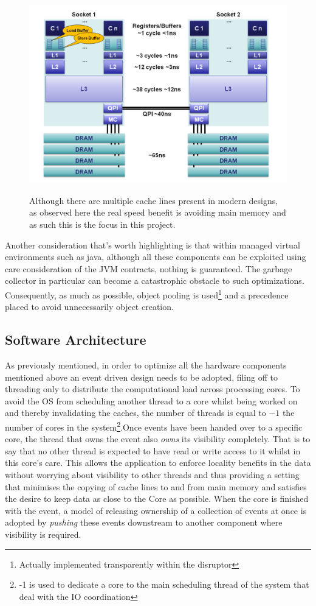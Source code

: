 \documentclass[a4paper,11pt]{scrreprt}
\begin{document}
\begin{figure}[h!]
\centering
\caption{Although there are multiple cache lines present in modern designs, as observed here the real speed benefit is avoiding main memory and as such this is the focus in this project.}
\includegraphics[scale=0.5] {cachelinespeed.png}
\label{fig:cachelinespeeds}
\end{figure}
Another consideration that's worth highlighting is that within managed virtual environments such as java, although all these components can be exploited using care consideration of the JVM contracts, nothing is guaranteed. The garbage collector in particular can become a catastrophic obstacle to such optimizations. Consequently, as much as possible, object pooling is used\footnote{Actually implemented transparently within the disruptor} and a precedence placed to avoid unnecessarily object creation.
\subsection{Software Architecture}
As previously mentioned, in order to optimize all the hardware components mentioned above an event driven design needs to be adopted, filing off to threading only to distribute the computational load across processing cores. To avoid the OS from scheduling another thread to a core whilst being worked on and thereby invalidating the caches, the number of threads is equal to \(-1\) the number of cores in the system\footnote{-1 is used to dedicate a core to the main scheduling thread of the system that deal with the IO coordination}.Once events have been handed over to a specific core, the thread that owns the event also \textit{owns} its visibility completely. That is to say that no other thread is expected to have read or write access to it whilst in this core's care. This allows the application to enforce locality benefits in the data without worrying about visibility to other threads and thus providing a setting that minimises the copying of cache lines to and from main memory and satisfies the desire to keep data as close to the Core as possible. When the core is finished with the event, a model of releasing ownership of a collection of events at once is adopted by \textit{pushing} these events downstream to another component where visibility is required. 
\end{document}
